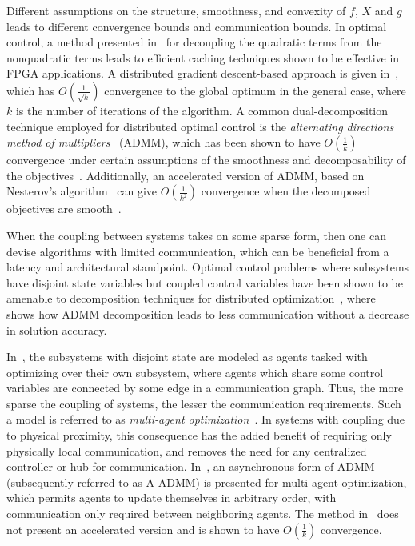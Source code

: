 Different assumptions on the structure, smoothness, and convexity of $f$, $X$ and $g$ leads to different convergence bounds and communication bounds. In optimal control, a method presented in~\cite{Donoghue2013Splitting} for decoupling the quadratic terms from the nonquadratic terms leads to efficient caching techniques shown to be effective in FPGA applications. A distributed gradient descent-based approach is given in~\cite{camponogara2009distributed}, which has $O\left(\frac{1}{\sqrt{k}}\right)$ convergence to the global optimum in the general case, where $k$ is the number of iterations of the algorithm.  A common dual-decomposition technique employed for distributed optimal control is the \emph{alternating directions method of multipliers}~\cite{gabay1976dual,Boyd2010a,Donoghue2013Splitting} (ADMM), which has been shown to have $O\left(\frac{1}{k}\right)$ convergence under certain assumptions of the smoothness and decomposability of the objectives~\cite{Wei2013On}. Additionally, an accelerated version of ADMM, based on Nesterov's algorithm~\cite{Nesterov1983Method} can give $O\left(\frac{1}{k^2}\right)$ convergence when the decomposed objectives are smooth~\cite{Pu2014Fast}.

When the coupling between systems takes on some sparse form, then one can devise algorithms with limited communication, which can be beneficial from a latency and  architectural standpoint. Optimal control problems where subsystems have disjoint state variables but coupled control variables have been shown to be amenable to decomposition techniques for distributed optimization~\cite{Giselsson2013Accelerated,camponogara2009distributed}, where~\cite{mota2012distributed} shows how ADMM decomposition leads to less communication without a decrease in solution accuracy.

In~\cite{mota2012distributed,Giselsson2013Accelerated,camponogara2009distributed}, the subsystems with disjoint state are modeled as agents tasked with optimizing over their own subsystem, where agents which share some control variables are connected by some edge in a communication graph. Thus, the more sparse the coupling of systems, the lesser the communication requirements. Such a model is referred to as \emph{multi-agent optimization}~\cite{Wei2013On}. In systems with coupling due to physical proximity, this consequence has the added benefit of requiring only physically local communication, and removes the need for any centralized controller or hub for communication. In~\cite{Wei2013On}, an asynchronous form of ADMM (subsequently referred to as A-ADMM) is presented for multi-agent optimization, which permits agents to update themselves in arbitrary order, with communication only required between neighboring agents. The method in~\cite{Wei2013On} does not present an accelerated version and is shown to have $O\left(\frac{1}{k}\right)$ convergence.

